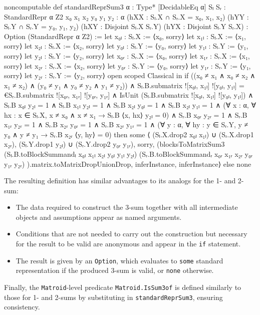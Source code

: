 \begin{leancode}
noncomputable def standardReprSum3 {α : Type*}
    [DecidableEq α]
    {Sₗ Sᵣ : StandardRepr α Z2}
    {x₀ x₁ x₂ y₀ y₁ y₂ : α}
    (hXX : Sₗ.X ∩ Sᵣ.X = {x₀, x₁, x₂})
    (hYY : Sₗ.Y ∩ Sᵣ.Y = {y₀, y₁, y₂})
    (hXY : Disjoint Sₗ.X Sᵣ.Y)
    (hYX : Disjoint Sₗ.Y Sᵣ.X) :
    Option (StandardRepr α Z2) :=
  let x₀ₗ : Sₗ.X := ⟨x₀, sorry⟩
  let x₁ₗ : Sₗ.X := ⟨x₁, sorry⟩
  let x₂ₗ : Sₗ.X := ⟨x₂, sorry⟩
  let y₀ₗ : Sₗ.Y := ⟨y₀, sorry⟩
  let y₁ₗ : Sₗ.Y := ⟨y₁, sorry⟩
  let y₂ₗ : Sₗ.Y := ⟨y₂, sorry⟩
  let x₀ᵣ : Sᵣ.X := ⟨x₀, sorry⟩
  let x₁ᵣ : Sᵣ.X := ⟨x₁, sorry⟩
  let x₂ᵣ : Sᵣ.X := ⟨x₂, sorry⟩
  let y₀ᵣ : Sᵣ.Y := ⟨y₀, sorry⟩
  let y₁ᵣ : Sᵣ.Y := ⟨y₁, sorry⟩
  let y₂ᵣ : Sᵣ.Y := ⟨y₂, sorry⟩
  open scoped Classical in if
    ((x₀ ≠ x₁ ∧ x₀ ≠ x₂ ∧ x₁ ≠ x₂) ∧
     (y₀ ≠ y₁ ∧ y₀ ≠ y₂ ∧ y₁ ≠ y₂))
    ∧ Sₗ.B.submatrix ![x₀ₗ, x₁ₗ] ![y₀ₗ, y₁ₗ] =
      €Sᵣ.B.submatrix ![x₀ᵣ, x₁ᵣ] ![y₀ᵣ, y₁ᵣ]
    ∧ IsUnit (Sₗ.B.submatrix ![x₀ₗ, x₁ₗ] ![y₀ₗ, y₁ₗ])
    ∧ Sₗ.B x₀ₗ y₂ₗ = 1
    ∧ Sₗ.B x₁ₗ y₂ₗ = 1
    ∧ Sₗ.B x₂ₗ y₀ₗ = 1
    ∧ Sₗ.B x₂ₗ y₁ₗ = 1
    ∧ (∀ x : α, ∀ hx : x ∈ Sₗ.X, x ≠ x₀ ∧ x ≠ x₁
        → Sₗ.B ⟨x, hx⟩ y₂ₗ = 0)
    ∧ Sᵣ.B x₀ᵣ y₂ᵣ = 1
    ∧ Sᵣ.B x₁ᵣ y₂ᵣ = 1
    ∧ Sᵣ.B x₂ᵣ y₀ᵣ = 1
    ∧ Sᵣ.B x₂ᵣ y₁ᵣ = 1
    ∧ (∀ y : α, ∀ hy : y ∈ Sᵣ.Y, y ≠ y₀ ∧ y ≠ y₁
        → Sᵣ.B x₂ᵣ ⟨y, hy⟩ = 0)
  then
    some ⟨
      (Sₗ.X.drop2 x₀ₗ x₁ₗ) ∪ (Sᵣ.X.drop1 x₂ᵣ),
      (Sₗ.Y.drop1 y₂ₗ) ∪ (Sᵣ.Y.drop2 y₀ᵣ y₁ᵣ),
      sorry,
      (blocksToMatrixSum3
        (Sₗ.B.toBlockSummandₗ x₀ₗ x₁ₗ x₂ₗ y₀ₗ y₁ₗ y₂ₗ)
        (Sᵣ.B.toBlockSummandᵣ x₀ᵣ x₁ᵣ x₂ᵣ y₀ᵣ y₁ᵣ y₂ᵣ)
      ).matrix.toMatrixDropUnionDrop,
      inferInstance,
      inferInstance⟩
  else
    none
\end{leancode}
The resulting definition has similar advantages to its analogs for the 1- and 2-sum:
\begin{itemize}
    \item The data required to construct the 3-sum together with all intermediate objects and assumptions appear as named arguments.
    \item Conditions that are not needed to carry out the construction but necessary for the result to be valid are anonymous and appear in the \texttt{if} statement.
    \item The result is given by an \texttt{Option}, which evaluates to \texttt{some} standard representation if the produced 3-sum is valid, or \texttt{none} otherwise.
\end{itemize}


Finally, the \texttt{Matroid}-level predicate \texttt{Matroid.IsSum3of} is defined similarly to those for 1- and 2-sums by substituting in \texttt{standardReprSum3}, ensuring consistency.
